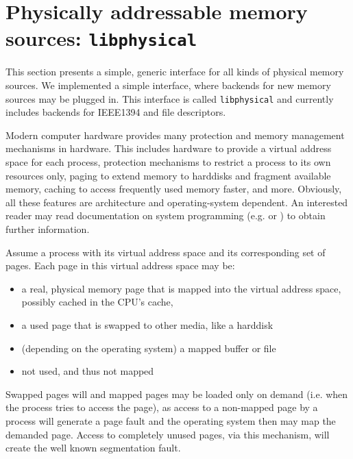 %
%

\section{Physically addressable memory sources: \texttt{libphysical}}

\label{memsources}

This section presents a simple, generic interface for all kinds of physical
memory sources. We implemented a simple interface, where backends for new memory
sources may be plugged in. This interface is called \texttt{libphysical} and
currently includes backends for IEEE1394 and file descriptors.

Modern computer hardware provides many protection and memory management
mechanisms in hardware. This includes hardware to provide a virtual address
space for each process, protection mechanisms to restrict a process to its own
resources only, paging to extend memory to harddisks and fragment available
memory, caching to access frequently used memory faster, and more. Obviously,
all these features are architecture and operating-system dependent. An
interested reader may read documentation on system programming (e.g\@.
\cite{rwth_syspro_scriptum:2002} or \cite{IA32_SDM_3a:2006,IA32_SDM_3b:2006}) to
obtain further information.

Assume a process with its virtual address space and its corresponding set of
pages. Each page in this virtual address space may be:

\begin{itemize}

	\item a real, physical memory page that is mapped into the virtual 
		address space, possibly cached in the CPU's cache,

	\item a used page that is swapped to other media, like a harddisk

	\item (depending on the operating system) a mapped buffer or file

	\item not used, and thus not mapped

\end{itemize}

Swapped pages will and mapped pages may be loaded only on demand (i.e\@. when
the process tries to access the page), as access to a non-mapped page by a
process will generate a page fault and the operating system then may map the
demanded page.  Access to completely unused pages, via this mechanism, will
create the well known segmentation fault.

